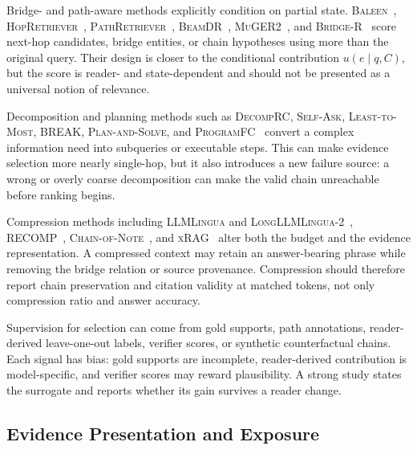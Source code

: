 \documentclass[manuscript,review]{acmart}
\theoremstyle{definition}
\theoremstyle{plain}
\theoremstyle{remark}
\begin{document}
Bridge- and path-aware methods explicitly condition on partial state.
\textsc{Baleen}~\cite{khattab2021baleen},
\textsc{HopRetriever}~\cite{li2020hopretriever},
\textsc{PathRetriever}~\cite{asai2020learning},
\textsc{BeamDR}~\cite{zhao2021beamdr},
\textsc{MuGER2}~\cite{yang2022muger}, and
\textsc{Bridge-R}~\cite{xu2024bridger} score next-hop candidates, bridge
entities, or chain hypotheses using more than the original query. Their design
is closer to the conditional contribution $u(e\mid q,C)$, but the score is
reader- and state-dependent and should not be presented as a universal notion
of relevance.

Decomposition and planning methods such as \textsc{DecompRC},
\textsc{Self-Ask}, \textsc{Least-to-Most}, \textsc{BREAK},
\textsc{Plan-and-Solve}, and
\textsc{ProgramFC}~\cite{min2019decomprc,press2022selfask,zhou2023leasttomost,wolfson2020break,wang2023planandsolve,pan2023programfc}
convert a complex information need into subqueries or executable steps. This
can make evidence selection more nearly single-hop, but it also introduces a
new failure source: a wrong or overly coarse decomposition can make the valid
chain unreachable before ranking begins.

Compression methods including \textsc{LLMLingua} and
\textsc{LongLLMLingua-2}~\cite{jiang2023llmlingua,pan2024longllmlingua2},
\textsc{RECOMP}~\cite{xu2023recomp}, \textsc{Chain-of-Note}~\cite{yu2023chainofnote},
and \textsc{xRAG}~\cite{cheng2024xrag} alter both the budget and the evidence
representation. A compressed context may retain an answer-bearing phrase
while removing the bridge relation or source provenance. Compression should
therefore report chain preservation and citation validity at matched tokens,
not only compression ratio and answer accuracy.

Supervision for selection can come from gold supports, path annotations,
reader-derived leave-one-out labels, verifier scores, or synthetic
counterfactual chains. Each signal has bias: gold supports are incomplete,
reader-derived contribution is model-specific, and verifier scores may reward
plausibility.
A strong study states the surrogate and reports whether its gain survives a
reader change.

\subsection{Evidence Presentation and Exposure}
\label{subsec:methods_exposure}
\end{document}

